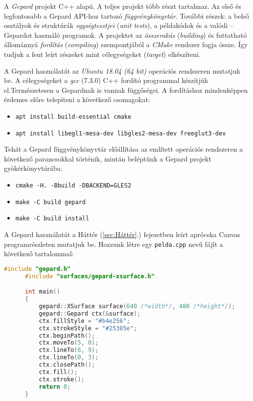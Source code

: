 \documentclass[12pt]{report}
\theoremstyle{definition}
\newcommand{\inenglish}[1]{\textsl{#1}}
\newcommand{\func}[1]{{\textsl{#1}}}
\begin{document}
A \emph{Gepard} projekt C++ alapú. A teljes projekt több részt tartalmaz. Az
első és legfontosabb a Gepard API-hoz tartozó \emph{függvénykönyvtár}. További
részek: a belső osztályok és struktúrák \emph{egységtesztjei} (\inenglish{unit
tests}), a példakódok és a valódi -- Gepardot használó programok. A projektet
az \emph{összerakás} (\inenglish{building}) és futtatható állománnyá
\emph{fordítás} (\inenglish{compiling}) szempontjából a \func{CMake} rendszer
fogja össze. Így tudjuk a fent leírt részeket mint célegységeket
(\inenglish{target}) elkészíteni.

A Gepard használatát az \emph{Ubuntu 18.04 (64 bit)} operációs rendszeren
mutatjuk be. A célegységeket a \emph{gcc} (7.3.0) C++ fordító programmal
készítjük el.Természetesen a Gepardnak is vannak függőségei. A fordításhoz
mindenképpen érdemes előre telepíteni a következő csomagokat:
  {\small
    \begin{itemize} \renewcommand\labelitemi{\texttt{\$}}
      \item \texttt{apt install build-essential cmake}
      \item\texttt{apt install libegl1-mesa-dev libgles2-mesa-dev freeglut3-dev}
    \end{itemize}
  }

Tehát a Gepard függvénykönyvtár előállítása az említett operációs rendszeren a
következő parancsokkal történik, miután beléptünk a Gepard projekt
gyökérkönyvtárába:
  {\small
    \begin{itemize} \renewcommand\labelitemi{\texttt{\$}}
      \item \texttt{cmake -H. -Bbuild -DBACKEND=GLES2}
      \item \texttt{make -C build gepard}
      \item \texttt{make -C build install}
    \end{itemize}
  }

A Gepard használatát a Háttér (\ref{sec:Háttér}.) fejezetben leírt aprócska
Canvas programrészleten mutatjuk be. Hozzunk létre egy
{\small\texttt{pelda.cpp}} nevű fájlt a következő tartalommal:

    \begin{lstlisting}[language=C++, autogobble=true]
      #include "gepard.h"
      #include "surfaces/gepard-xsurface.h"

      int main()
      {
          gepard::XSurface surface(640 /*width*/, 480 /*height*/);
          gepard::Gepard ctx(&surface);
          ctx.fillStyle = "#b4e256";
          ctx.strokeStyle = "#25385e";
          ctx.beginPath();
          ctx.moveTo(5, 0);
          ctx.lineTo(6, 9);
          ctx.lineTo(0, 3);
          ctx.closePath();
          ctx.fill();
          ctx.stroke();
          return 0;
      }
    \end{lstlisting}
  \endminipage
\\
\end{document}
